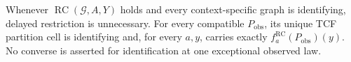 Whenever \(\operatorname{RC}(\mathcal G,A,Y)\) holds and every context-specific graph is identifying, delayed restriction is unnecessary. For every compatible \(P_{\mathrm{obs}}\), its unique TCF partition cell is identifying and, for every \(a,y\), carries exactly \(f_a^{\mathrm{RC}}(P_{\mathrm{obs}})(y)\). No converse is asserted for identification at one exceptional observed law.